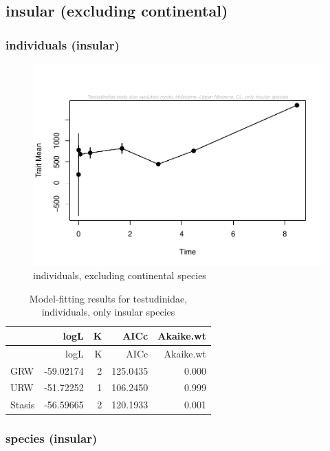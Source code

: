 \documentclass[]{article}
\begin{document}
\newpage

\subsection{insular (excluding
continental)}\label{insular-excluding-continental}

\subsubsection{individuals (insular)}\label{individuals-insular}

\begin{figure}[htbp]
\centering
\includegraphics{MA_JJ_files/figure-latex/paleoTS, individuals, exluding continental species-1.pdf}
\caption{individuals, excluding continental species}
\end{figure}

\begin{longtable}[]{@{}lrrrr@{}}
\caption{Model-fitting results for testudinidae, individuals, only
insular species}\tabularnewline
\toprule
& logL & K & AICc & Akaike.wt\tabularnewline
\midrule
\endfirsthead
\toprule
& logL & K & AICc & Akaike.wt\tabularnewline
\midrule
\endhead
GRW & -59.02174 & 2 & 125.0435 & 0.000\tabularnewline
URW & -51.72252 & 1 & 106.2450 & 0.999\tabularnewline
Stasis & -56.59665 & 2 & 120.1933 & 0.001\tabularnewline
\bottomrule
\end{longtable}

\newpage

\subsubsection{species (insular)}\label{species-insular}
\end{document}
